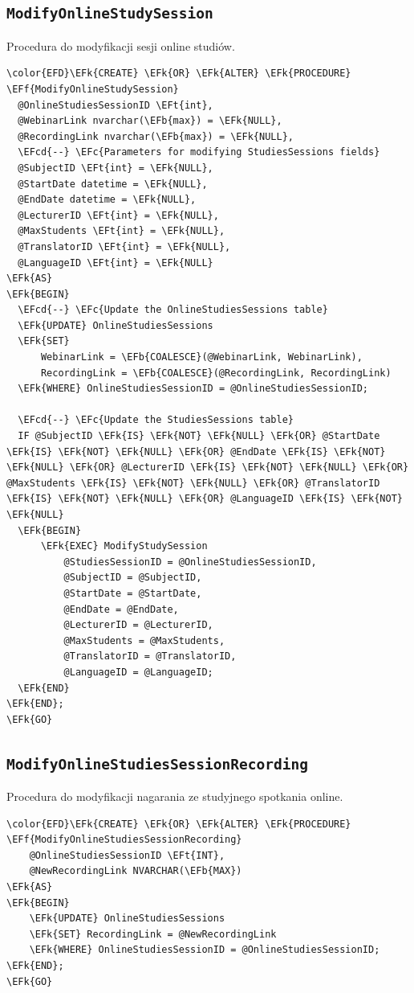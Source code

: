 \documentclass[11pt]{article}
\newcommand{\EFc}[1]{\textcolor{EFc}{\textit{#1}}} %
\newcommand{\EFcd}[1]{\textcolor{EFcd}{\textit{#1}}} %
\newcommand{\EFk}[1]{\textcolor{EFk}{\textbf{#1}}} %
\newcommand{\EFb}[1]{\textcolor{EFb}{\textbf{#1}}} %
\newcommand{\EFf}[1]{\textcolor{EFf}{#1}} %
\newcommand{\EFt}[1]{\textcolor{EFt}{\textbf{#1}}} %
\begin{document}
\subsection{\texttt{ModifyOnlineStudySession}}
\label{sec:orgceb59ab}
Procedura do modyfikacji sesji online studiów.
\begin{Code}
\begin{Verbatim}
\color{EFD}\EFk{CREATE} \EFk{OR} \EFk{ALTER} \EFk{PROCEDURE} \EFf{ModifyOnlineStudySession}
  @OnlineStudiesSessionID \EFt{int},
  @WebinarLink nvarchar(\EFb{max}) = \EFk{NULL},
  @RecordingLink nvarchar(\EFb{max}) = \EFk{NULL},
  \EFcd{--} \EFc{Parameters for modifying StudiesSessions fields}
  @SubjectID \EFt{int} = \EFk{NULL},
  @StartDate datetime = \EFk{NULL},
  @EndDate datetime = \EFk{NULL},
  @LecturerID \EFt{int} = \EFk{NULL},
  @MaxStudents \EFt{int} = \EFk{NULL},
  @TranslatorID \EFt{int} = \EFk{NULL},
  @LanguageID \EFt{int} = \EFk{NULL}
\EFk{AS}
\EFk{BEGIN}
  \EFcd{--} \EFc{Update the OnlineStudiesSessions table}
  \EFk{UPDATE} OnlineStudiesSessions
  \EFk{SET}
      WebinarLink = \EFb{COALESCE}(@WebinarLink, WebinarLink),
      RecordingLink = \EFb{COALESCE}(@RecordingLink, RecordingLink)
  \EFk{WHERE} OnlineStudiesSessionID = @OnlineStudiesSessionID;

  \EFcd{--} \EFc{Update the StudiesSessions table}
  IF @SubjectID \EFk{IS} \EFk{NOT} \EFk{NULL} \EFk{OR} @StartDate \EFk{IS} \EFk{NOT} \EFk{NULL} \EFk{OR} @EndDate \EFk{IS} \EFk{NOT} \EFk{NULL} \EFk{OR} @LecturerID \EFk{IS} \EFk{NOT} \EFk{NULL} \EFk{OR} @MaxStudents \EFk{IS} \EFk{NOT} \EFk{NULL} \EFk{OR} @TranslatorID \EFk{IS} \EFk{NOT} \EFk{NULL} \EFk{OR} @LanguageID \EFk{IS} \EFk{NOT} \EFk{NULL}
  \EFk{BEGIN}
      \EFk{EXEC} ModifyStudySession
          @StudiesSessionID = @OnlineStudiesSessionID,
          @SubjectID = @SubjectID,
          @StartDate = @StartDate,
          @EndDate = @EndDate,
          @LecturerID = @LecturerID,
          @MaxStudents = @MaxStudents,
          @TranslatorID = @TranslatorID,
          @LanguageID = @LanguageID;
  \EFk{END}
\EFk{END};
\EFk{GO}
\end{Verbatim}
\end{Code}
\subsection{\texttt{ModifyOnlineStudiesSessionRecording}}
\label{sec:orga3d444e}
Procedura do modyfikacji nagarania ze studyjnego spotkania online.
\begin{Code}
\begin{Verbatim}
\color{EFD}\EFk{CREATE} \EFk{OR} \EFk{ALTER} \EFk{PROCEDURE} \EFf{ModifyOnlineStudiesSessionRecording}
    @OnlineStudiesSessionID \EFt{INT},
    @NewRecordingLink NVARCHAR(\EFb{MAX})
\EFk{AS}
\EFk{BEGIN}
    \EFk{UPDATE} OnlineStudiesSessions
    \EFk{SET} RecordingLink = @NewRecordingLink
    \EFk{WHERE} OnlineStudiesSessionID = @OnlineStudiesSessionID;
\EFk{END};
\EFk{GO}
\end{Verbatim}
\end{Code}
\end{document}
